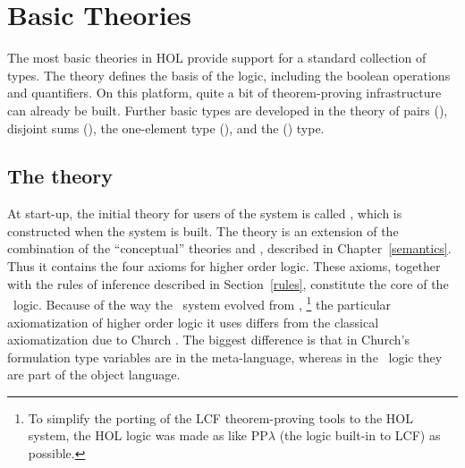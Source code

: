 \section{Basic Theories}

The most basic theories in HOL provide support for a standard
collection of types. The theory  defines the basis of
the \HOL{} logic, including the boolean operations and
quantifiers. On this platform, quite a bit of theorem-proving
infrastructure can already be built. Further basic types are developed
in the theory of pairs (), disjoint sums
(), the one-element type (), and the
() type.


\subsection{The theory }\label{boolfull}

%
At start-up, the initial theory for users of the \HOL{} system is
called , which is constructed when the
\HOL{} system is built. The theory  is an extension of
the combination of the ``conceptual'' theories  and
, described in Chapter~\ref{semantics}.  Thus it contains
the four axioms
%
%
for higher order logic. These axioms, together with the rules of
inference described in Section~\ref{rules}, constitute the core of the
\HOL\ logic.  Because of the way the \HOL\ system evolved from \LCF,
%
%
\footnote{To simplify the porting of the LCF theorem-proving tools to
  the HOL system, the HOL logic was made as like PP$\lambda$ (the
  logic built-in to LCF) as possible.} the particular
axiomatization
%
%
of higher order logic it uses differs from the classical
axiomatization due to Church  \cite{Church}.  The
biggest difference is that in Church's formulation type
variables
%
%
are in the meta-language, whereas in the \HOL\ logic they are part of
the object language.

